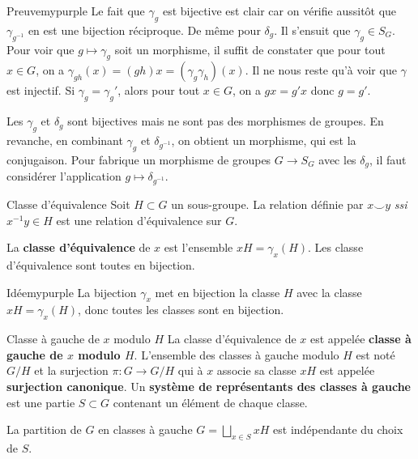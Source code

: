     \begin{demo}{Preuve}{mypurple}
        Le fait que $\gamma_g$ est bijective est clair car on vérifie aussitôt que $\gamma_{g^{-1}}$ en est une bijection réciproque. De même pour $\delta_g$. Il s’ensuit que $\gamma_g \in S_G$. Pour voir que $g \mapsto \gamma_g$ soit un morphisme, il suffit de constater que pour tout $x \in G$, on a $\gamma_{gh}(x) = (gh)x = (\gamma_g \gamma_h)(x)$. Il ne nous reste qu’à voir que $\gamma$ est injectif. Si $\gamma_g = \gamma_g'$, alors pour tout $x \in G$, on a $gx = g'x$ donc $g = g'$.
    \end{demo}

    Les $\gamma_g$ et $\delta_g$ sont bijectives mais ne sont pas des morphismes de groupes. En revanche, en combinant $\gamma_{g}$ et $\delta_{g^{-1}}$, on obtient un morphisme, qui est la conjugaison. Pour fabrique un morphisme de groupes $G \to S_G$ avec les $\delta_g$, il faut considérer l’application $g \mapsto \delta_{g^{-1}}$.

    \begin{defitheo}{Classe d’équivalence}{}
        Soit $H \subset G$ un sous-groupe. La relation définie par $x \smile y$ \textit{ssi} $x^{-1} y \in H$ est une relation d’équivalence sur $G$. 

        La \textbf{classe d’équivalence} de $x$ est l’ensemble $xH = \gamma_{x}(H)$. Les classe d’équivalence sont toutes en bijection.
    \end{defitheo}

    \begin{demo}{Idée}{mypurple}
        La bijection $\gamma_x$ met en bijection la classe $H$ avec la classe $xH = \gamma_x(H)$, donc toutes les classes sont en bijection.
    \end{demo}

    \begin{defitheo}{Classe à gauche de $x$ modulo $H$}{}
        La classe d’équivalence de $x$ est appelée \textbf{classe à gauche de $x$ modulo $H$}. L’ensemble des classes à gauche modulo $H$ est noté $G / H$ et la surjection $\pi : G \to G / H$ qui à $x$ associe sa classe $x H$ est appelée \textbf{surjection canonique}. Un \textbf{système de représentants des classes à gauche} est une partie $S \subset G$ contenant un élément de chaque classe.
        
        La partition de $G$ en classes à gauche $G = \bigsqcup_{x \in S} xH$ est indépendante du choix de $S$.
    \end{defitheo}

